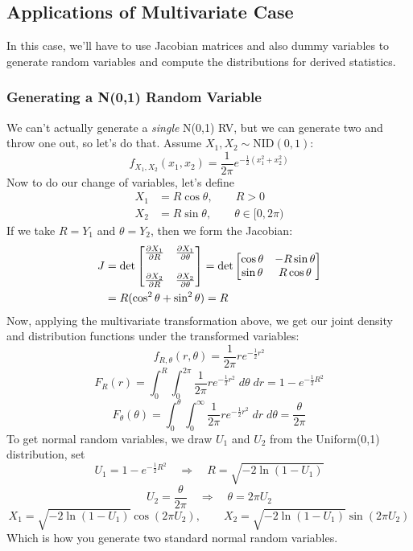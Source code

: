 \documentclass[a4paper,12pt]{scrartcl}
\begin{document}
\newpage
\subsection{Applications of Multivariate Case}

In this case, we'll have to use Jacobian matrices and also dummy
variables to generate random variables and compute the distributions
for derived statistics.


\subsubsection{Generating a N(0,1) Random Variable}

We can't actually generate a \emph{single} N(0,1) RV, but we can
generate two and throw one out, so let's do that. Assume
$X_1, X_2\sim \text{NID}(0,1)$:
   \[ f_{X_1, X_2}(x_1,x_2) = \frac{1}{2\pi} e^{-\frac{1}{2}(x_1^2 +
      x_2^2)} \]
Now to do our change of variables, let's define
\begin{align*}
   X_1 &= R \cos\theta, \qquad R > 0 \\
   X_2 &= R \sin \theta, \qquad \theta \in [0,2\pi)
\end{align*}
If we take $R = Y_1$ and $\theta = Y_2$, then we form the Jacobian:
\begin{align}
   J &= \det \begin{bmatrix} \frac{\partial X_1}{\partial R} &
   \frac{\partial X_1}{\partial \theta} \\\\
   \frac{\partial X_2}{\partial R} &
   \frac{\partial X_2}{\partial \theta}
   \end{bmatrix} =
   \det \begin{bmatrix} \cos \theta & -R \sin \theta \\
      \sin \theta & R \cos \theta \end{bmatrix} \notag\\
   &= R(\cos^2 \theta + \sin^2 \theta) = R
\end{align}
Now, applying the multivariate transformation above, we get
our joint density and distribution functions under the transformed
variables:
   \[f_{R,\theta}(r,\theta) = \frac{1}{2\pi} r e^{-\frac{1}{2}r^2}\]
   \[ F_R(r) = \int^R_0 \int^{2\pi}_0 \frac{1}{2\pi} r e^{-\frac{1}{2}
      r^2} \; d\theta\;dr = 1 - e^{-\frac{1}{2} R^2} \]
   \[ F_\theta(\theta) =
      \int^\theta_0 \int^\infty_0 \frac{1}{2\pi} r e^{-\frac{1}{2}
   r^2} \;dr\; d\theta = \frac{\theta}{2\pi}
      \]
To get normal random variables, we draw $U_1$ and $U_2$ from the
Uniform(0,1) distribution, set
   \[ U_1 = 1- e^{-\frac{1}{2}R^2} \quad \Rightarrow \quad
      R = \sqrt{-2\ln(1-U_1)} \]
   \[ U_2 = \frac{\theta}{2\pi} \quad \Rightarrow \quad
      \theta = 2\pi U_2 \]
   \[ X_1 = \sqrt{-2\ln(1-U_1)} \cos (2\pi U_2), \qquad
      X_2 = \sqrt{-2\ln(1-U_1)} \sin (2\pi U_2) \]
Which is how you generate two standard normal random variables.
\end{document}
